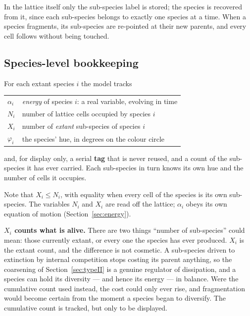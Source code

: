 \documentclass[11pt,a4paper]{article}
\begin{document}
In the lattice itself only the sub-species label is stored; the species is recovered
from it, since each sub-species belongs to exactly one species at a time. When a species
fragments, its sub-species are re-pointed at their new parents, and every cell follows
without being touched.

\subsection{Species-level bookkeeping}

For each extant species $i$ the model tracks

\begin{center}
\begin{tabular}{ll}
\toprule
$\alpha_i$ & \emph{energy} of species $i$: a real variable, evolving in time \\
$N_i$      & number of lattice cells occupied by species $i$ \\
$X_i$      & number of \emph{extant} sub-species of species $i$ \\
$\varphi_i$ & the species' hue, in degrees on the colour circle \\
\bottomrule
\end{tabular}
\end{center}

\noindent
and, for display only, a serial \textbf{tag} that is never reused, and a count of the
sub-species it has ever carried. Each sub-species in turn knows its own hue and the
number of cells it occupies.

Note that $X_i \le N_i$, with equality when every cell of the species is its own
sub-species. The variables $N_i$ and $X_i$ are read off the lattice; $\alpha_i$ obeys its
own equation of motion (Section~\ref{sec:energy}).

\medskip
\noindent
\textbf{$X_i$ counts what is alive.} There are two things ``number of sub-species'' could
mean: those currently extant, or every one the species has ever produced. $X_i$ is the
extant count, and the difference is not cosmetic. A sub-species driven to extinction by
internal competition stops costing its parent anything, so the coarsening of
Section~\ref{sec:typeII} is a genuine regulator of dissipation, and a species can hold its
diversity --- and hence its energy --- in balance. Were the cumulative count used instead,
the cost could only ever rise, and fragmentation would become certain from the moment a
species began to diversify. The cumulative count is tracked, but only to be displayed.
\end{document}

